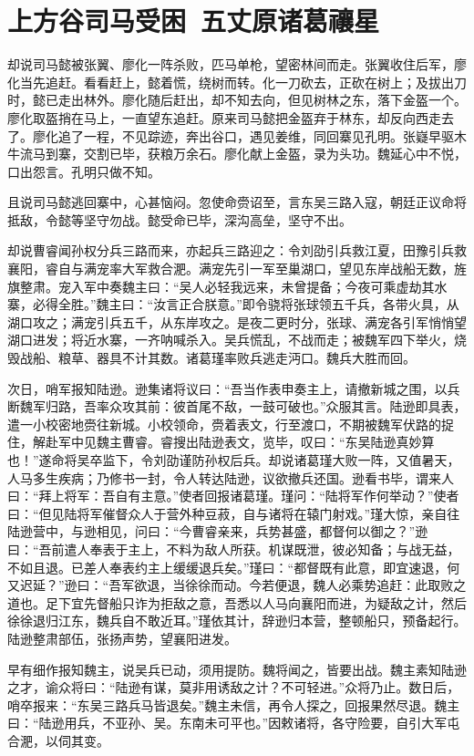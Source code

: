 \chapter{上方谷司马受困~五丈原诸葛禳星}

却说司马懿被张翼、廖化一阵杀败，匹马单枪，望密林间而走。张翼收住后军，廖化当先追赶。看看赶上，懿着慌，绕树而转。化一刀砍去，正砍在树上；及拔出刀时，懿已走出林外。廖化随后赶出，却不知去向，但见树林之东，落下金盔一个。廖化取盔捎在马上，一直望东追赶。原来司马懿把金盔弃于林东，却反向西走去了。廖化追了一程，不见踪迹，奔出谷口，遇见姜维，同回寨见孔明。张嶷早驱木牛流马到寨，交割已毕，获粮万余石。廖化献上金盔，录为头功。魏延心中不悦，口出怨言。孔明只做不知。

且说司马懿逃回寨中，心甚恼闷。忽使命赍诏至，言东吴三路入寇，朝廷正议命将抵敌，令懿等坚守勿战。懿受命已毕，深沟高垒，坚守不出。

却说曹睿闻孙权分兵三路而来，亦起兵三路迎之：令刘劭引兵救江夏，田豫引兵救襄阳，睿自与满宠率大军救合淝。满宠先引一军至巢湖口，望见东岸战船无数，旌旗整肃。宠入军中奏魏主曰：“吴人必轻我远来，未曾提备；今夜可乘虚劫其水寨，必得全胜。”魏主曰：“汝言正合朕意。”即令骁将张球领五千兵，各带火具，从湖口攻之；满宠引兵五千，从东岸攻之。是夜二更时分，张球、满宠各引军悄悄望湖口进发；将近水寨，一齐呐喊杀入。吴兵慌乱，不战而走；被魏军四下举火，烧毁战船、粮草、器具不计其数。诸葛瑾率败兵逃走沔口。魏兵大胜而回。

次日，哨军报知陆逊。逊集诸将议曰：“吾当作表申奏主上，请撤新城之围，以兵断魏军归路，吾率众攻其前：彼首尾不敌，一鼓可破也。”众服其言。陆逊即具表，遣一小校密地赍往新城。小校领命，赍着表文，行至渡口，不期被魏军伏路的捉住，解赴军中见魏主曹睿。睿搜出陆逊表文，览毕，叹曰：“东吴陆逊真妙算也！”遂命将吴卒监下，令刘劭谨防孙权后兵。却说诸葛瑾大败一阵，又值暑天，人马多生疾病；乃修书一封，令人转达陆逊，议欲撤兵还国。逊看书毕，谓来人曰：“拜上将军：吾自有主意。”使者回报诸葛瑾。瑾问：“陆将军作何举动？”使者曰：“但见陆将军催督众人于营外种豆菽，自与诸将在辕门射戏。”瑾大惊，亲自往陆逊营中，与逊相见，问曰：“今曹睿亲来，兵势甚盛，都督何以御之？”逊曰：“吾前遣人奉表于主上，不料为敌人所获。机谋既泄，彼必知备；与战无益，不如且退。已差人奉表约主上缓缓退兵矣。”瑾曰：“都督既有此意，即宜速退，何又迟延？”逊曰：“吾军欲退，当徐徐而动。今若便退，魏人必乘势追赶：此取败之道也。足下宜先督船只诈为拒敌之意，吾悉以人马向襄阳而进，为疑敌之计，然后徐徐退归江东，魏兵自不敢近耳。”瑾依其计，辞逊归本营，整顿船只，预备起行。陆逊整肃部伍，张扬声势，望襄阳进发。

早有细作报知魏主，说吴兵已动，须用提防。魏将闻之，皆要出战。魏主素知陆逊之才，谕众将曰：“陆逊有谋，莫非用诱敌之计？不可轻进。”众将乃止。数日后，哨卒报来：“东吴三路兵马皆退矣。”魏主未信，再令人探之，回报果然尽退。魏主曰：“陆逊用兵，不亚孙、吴。东南未可平也。”因敕诸将，各守险要，自引大军屯合淝，以伺其变。

